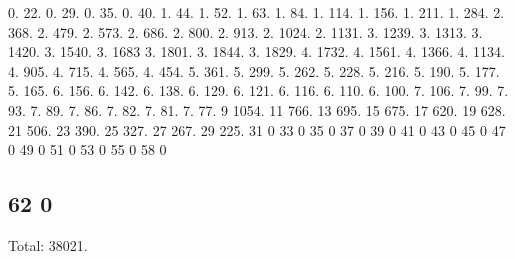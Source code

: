 0. 22. 0. 29. 0. 35. 0. 40. 1. 44. 1. 52. 1. 63. 1. 84. 1. 114. 1. 156. 1. 211. 1. 284. 2. 368. 2. 479. 2. 573. 2. 686. 2. 800. 2. 913. 2. 1024. 2. 1131. 3. 1239. 3. 1313. 3. 1420. 3. 1540. 3. 1683 3. 1801. 3. 1844. 3. 1829. 4. 1732. 4. 1561. 4. 1366. 4. 1134. 4. 905. 4. 715. 4. 565. 4. 454. 5. 361. 5. 299. 5. 262. 5. 228. 5. 216. 5. 190. 5. 177. 5. 165. 6. 156. 6. 142. 6. 138. 6. 129. 6. 121. 6. 116. 6. 110. 6. 100. 7. 106. 7. 99. 7. 93. 7. 89. 7. 86. 7. 82. 7. 81. 7. 77. 9 1054. 11 766. 13 695. 15 675. 17 620. 19 628. 21 506. 23 390. 25 327. 27 267. 29 225. 31 0 33 0 35 0 37 0 39 0 41 0 43 0 45 0 47 0 49 0 51 0 53 0 55 0 58 0 \subsection*{62 0 }

Total\+: 38021. 
